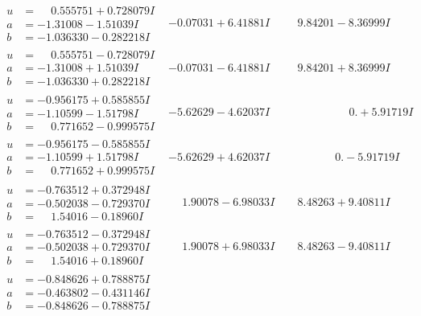 \documentclass[1p]{elsarticle_modified}
\theoremstyle{definition}
\begin{document}
$$\begin{array}{c|c|c}
\begin{aligned}
u &= \phantom{-}0.555751 + 0.728079 I \\
a &= -1.31008 - 1.51039 I \\
b &= -1.036330 - 0.282218 I\end{aligned}
 & -0.07031 + 6.41881 I & \phantom{-}9.84201 - 8.36999 I \\ \hline\begin{aligned}
u &= \phantom{-}0.555751 - 0.728079 I \\
a &= -1.31008 + 1.51039 I \\
b &= -1.036330 + 0.282218 I\end{aligned}
 & -0.07031 - 6.41881 I & \phantom{-}9.84201 + 8.36999 I \\ \hline\begin{aligned}
u &= -0.956175 + 0.585855 I \\
a &= -1.10599 - 1.51798 I \\
b &= \phantom{-}0.771652 - 0.999575 I\end{aligned}
 & -5.62629 - 4.62037 I & \phantom{-0.000000 -}0. + 5.91719 I \\ \hline\begin{aligned}
u &= -0.956175 - 0.585855 I \\
a &= -1.10599 + 1.51798 I \\
b &= \phantom{-}0.771652 + 0.999575 I\end{aligned}
 & -5.62629 + 4.62037 I & \phantom{-0.000000 } 0. - 5.91719 I \\ \hline\begin{aligned}
u &= -0.763512 + 0.372948 I \\
a &= -0.502038 - 0.729370 I \\
b &= \phantom{-}1.54016 - 0.18960 I\end{aligned}
 & \phantom{-}1.90078 - 6.98033 I & \phantom{-}8.48263 + 9.40811 I \\ \hline\begin{aligned}
u &= -0.763512 - 0.372948 I \\
a &= -0.502038 + 0.729370 I \\
b &= \phantom{-}1.54016 + 0.18960 I\end{aligned}
 & \phantom{-}1.90078 + 6.98033 I & \phantom{-}8.48263 - 9.40811 I \\ \hline\begin{aligned}
u &= -0.848626 + 0.788875 I \\
a &= -0.463802 - 0.431146 I \\
b &= -0.848626 - 0.788875 I\end{aligned}

\end{array}$$
\end{document}

